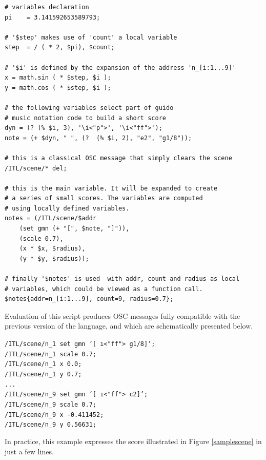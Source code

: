 \documentclass[runningheads]{llncs}
\newcommand{\code}	[2][0.9]	{\vspace{0mm}\begin{center}\colorbox{mygrey}{
							\begin{minipage}[t]{#1\columnwidth} 
							{\small \texttt{#2}}
							\end{minipage}}\end{center}}
\begin{document}
\begin{lstlisting}[language=inscore, extendedchars=true, basicstyle=\small\ttfamily]
# variables declaration 
pi    = 3.141592653589793;

# '$step' makes use of 'count' a local variable 
step  = / ( * 2, $pi), $count;

# '$i' is defined by the expansion of the address 'n_[i:1...9]'
x = math.sin ( * $step, $i );
y = math.cos ( * $step, $i );

# the following variables select part of guido
# music notation code to build a short score
dyn = (? (% $i, 3), '\i<"p">', '\i<"ff">');
note = (+ $dyn, " ", (?  (% $i, 2), "e2", "g1/8"));

# this is a classical OSC message that simply clears the scene
/ITL/scene/* del;

# this is the main variable. It will be expanded to create 
# a series of small scores. The variables are computed 
# using locally defined variables.  
notes = (/ITL/scene/$addr  
	(set gmn (+ "[", $note, "]")),
	(scale 0.7),
	(x * $x, $radius),
	(y * $y, $radius)); 

# finally '$notes' is used  with addr, count and radius as local
# variables, which could be viewed as a function call.
$notes{addr=n_[i:1...9], count=9, radius=0.7};
\end{lstlisting}


Evaluation of this script produces OSC messages fully compatible with the previous version of the language, and which are schematically presented below. 
\code[1]{/ITL/scene/n\_1 set gmn '[ \i<"ff"> g1/8]';\\
/ITL/scene/n\_1 scale 0.7;\\
/ITL/scene/n\_1 x 0.0;\\
/ITL/scene/n\_1 y 0.7;\\
...\\
/ITL/scene/n\_9 set gmn '[ \i<"ff"> c2]';\\
/ITL/scene/n\_9 scale 0.7;\\
/ITL/scene/n\_9 x -0.411452;\\
/ITL/scene/n\_9 y 0.56631;
}
In practice, this example expresses the score illustrated in Figure \ref{samplescene} in just a few lines.  
\end{document}
